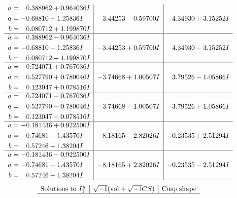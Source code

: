 \documentclass[1p]{elsarticle_modified}
\theoremstyle{definition}
\newcommand{\I}{\sqrt{-1}}
\begin{document}
$$\begin{array}{c|c|c}
\begin{aligned}
u &= \phantom{-}0.388962 + 0.964036 I \\
a &= -0.68810 + 1.25836 I \\
b &= \phantom{-}0.080712 + 1.199870 I\end{aligned}
 & -3.44253 - 0.59700 I & \phantom{-}4.34930 + 3.15252 I \\ \hline\begin{aligned}
u &= \phantom{-}0.388962 - 0.964036 I \\
a &= -0.68810 - 1.25836 I \\
b &= \phantom{-}0.080712 - 1.199870 I\end{aligned}
 & -3.44253 + 0.59700 I & \phantom{-}4.34930 - 3.15252 I \\ \hline\begin{aligned}
u &= \phantom{-}0.724071 + 0.767036 I \\
a &= \phantom{-}0.527790 + 0.780046 I \\
b &= \phantom{-}0.123047 + 0.078516 I\end{aligned}
 & -3.74668 + 1.00507 I & \phantom{-}3.79526 - 1.05866 I \\ \hline\begin{aligned}
u &= \phantom{-}0.724071 - 0.767036 I \\
a &= \phantom{-}0.527790 - 0.780046 I \\
b &= \phantom{-}0.123047 - 0.078516 I\end{aligned}
 & -3.74668 - 1.00507 I & \phantom{-}3.79526 + 1.05866 I \\ \hline\begin{aligned}
u &= -0.181436 + 0.922500 I \\
a &= -0.74681 - 1.43570 I \\
b &= \phantom{-}0.57246 - 1.38204 I\end{aligned}
 & -8.18165 - 2.82026 I & -0.23535 + 2.51294 I \\ \hline\begin{aligned}
u &= -0.181436 - 0.922500 I \\
a &= -0.74681 + 1.43570 I \\
b &= \phantom{-}0.57246 + 1.38204 I\end{aligned}
 & -8.18165 + 2.82026 I & -0.23535 - 2.51294 I\\
 \hline 
 \end{array}$$\newpage$$\begin{array}{c|c|c}  
\text{Solutions to }I^u_{1}& \I (\text{vol} + \sqrt{-1}CS) & \text{Cusp shape}\\
 \hline 

\end{array}$$
\end{document}
